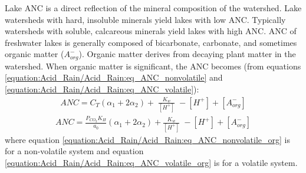 \documentclass[letterpaper,10pt,english]{sphinxmanual}
\begin{document}
Lake ANC is a direct reflection of the mineral composition of the watershed. Lake watersheds with hard, insoluble minerals yield lakes with low ANC. Typically watersheds with soluble, calcareous minerals yield lakes with high ANC. ANC of freshwater lakes is generally composed of bicarbonate, carbonate, and sometimes organic matter (\({A}_{{org}}^{{-}}\)). Organic matter derives from decaying plant matter in the watershed. When organic matter is significant, the ANC becomes (from equations \eqref{equation:Acid_Rain/Acid_Rain:eq_ANC_nonvolatile} and \eqref{equation:Acid_Rain/Acid_Rain:eq_ANC_volatile}):
\begin{equation}\label{equation:Acid_Rain/Acid_Rain:eq_ANC_nonvolatile_org}
\begin{split} ANC=C_{T} (\alpha _{1} +2\alpha _{2} )+{\; }\frac{K_{w} }{\left[{H}^{+} \right]} \; -\left[{H}^{+} \right]+\left[{A}_{{org}}^{{-}} \right]\end{split}
\end{equation}\begin{equation}\label{equation:Acid_Rain/Acid_Rain:eq_ANC_volatile_org}
\begin{split} ANC=\frac{P_{CO_{2} } K_{H} }{a_{0} } (\alpha _{1} +2\alpha _{2} )+\frac{K_{w} }{\left[{H}^{+} \right]} \; -\left[{H}^{+} \right]+\left[{A}_{{org}}^{{-}} \right]\end{split}
\end{equation}
where equation \eqref{equation:Acid_Rain/Acid_Rain:eq_ANC_nonvolatile_org} is for a non-volatile system and equation \eqref{equation:Acid_Rain/Acid_Rain:eq_ANC_volatile_org} is for a volatile system.
\end{document}
